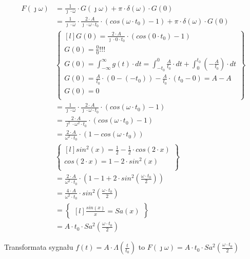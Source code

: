\begin{task}
\begin{align*}
F(\jmath \omega)&= \frac{1}{\jmath \cdot \omega} \cdot G(\jmath \omega) + \pi \cdot \delta(\omega) \cdot G(0)\\
&=\frac{1}{\jmath \cdot \omega} \cdot \frac{2 \cdot A}{\jmath \cdot \omega \cdot t_{0}} \cdot \left(cos(\omega \cdot t_{0}) -1\right) + \pi \cdot \delta(\omega) \cdot G(0)\\
&\begin{Bmatrix*}[l]
G(0)=\frac{2 \cdot A}{\jmath \cdot 0 \cdot t_{0}} \cdot \left(cos(0 \cdot t_{0}) -1\right)\\
G(0)=\frac{0}{0}!!!\\
G(0)=\int_{-\infty}^{\infty} g(t) \cdot dt=\int_{-t_{0}}^{0} \frac{A}{t_{0}} \cdot dt+\int_{0}^{t_{0}} (-\frac{A}{t_{0}}) \cdot dt\\
G(0)=\frac{A}{t_{0}} \cdot (0 -(-t_{0}))-\frac{A}{t_{0}} \cdot (t_{0} - 0)= A- A\\
G(0)=0\\
\end{Bmatrix*}\\
&=\frac{1}{\jmath \cdot \omega} \cdot \frac{2 \cdot A}{\jmath \cdot \omega \cdot t_{0}} \cdot \left(cos(\omega \cdot t_{0}) -1\right)\\
&=\frac{2 \cdot A}{\jmath^{2} \cdot \omega^{2} \cdot t_{0}} \cdot \left(cos(\omega \cdot t_{0}) -1\right)\\
&=\frac{2 \cdot A}{\omega^{2} \cdot t_{0}} \cdot \left(1 - cos(\omega \cdot t_{0})\right)\\
&\begin{Bmatrix*}[l]
sin^{2}(x)= \frac{1}{2}-\frac{1}{2} \cdot cos(2 \cdot x)\\
cos(2 \cdot x)= 1 - 2 \cdot sin^{2}(x)\\
\end{Bmatrix*}\\
&=\frac{2 \cdot A}{\omega^{2} \cdot t_{0}} \cdot \left(1 - 1 + 2 \cdot sin^{2}\left(\frac{\omega \cdot t_{0}}{2}\right)\right)\\
&=\frac{4 \cdot A}{\omega^{2} \cdot t_{0}} \cdot sin^{2}\left(\frac{\omega \cdot t_{0}}{2}\right)\\
&=\begin{Bmatrix*}[l]
\frac{sin(x)}{x}=Sa(x)
\end{Bmatrix*}\\
&=A \cdot t_{0} \cdot Sa^{2}(\frac{\omega \cdot t_{0}}{2})
\end{align*}

Transformata sygnału $f(t) = A \cdot \Lambda(\frac{t}{t_{0}})$ to $F(\jmath \omega)=A \cdot t_{0} \cdot Sa^{2}(\frac{\omega \cdot t_{0}}{2})$

\end{task}
